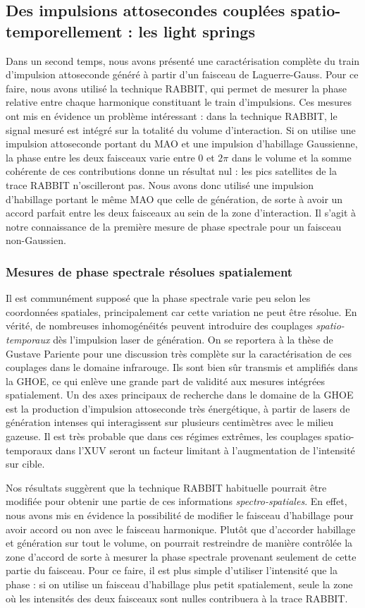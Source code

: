 \subsection{Des impulsions attosecondes couplées spatio-temporellement : les light springs}
Dans un second temps, nous avons présenté une caractérisation complète du train d'impulsion attoseconde généré à partir d'un faisceau de Laguerre-Gauss. Pour ce faire, nous avons utilisé la technique RABBIT, qui permet de mesurer la phase relative entre chaque harmonique constituant le train d'impulsions. Ces mesures ont mis en évidence un problème intéressant : dans la technique RABBIT, le signal mesuré est intégré sur la totalité du volume d'interaction. Si on utilise une impulsion attoseconde portant du MAO et une impulsion d'habillage Gaussienne, la phase entre les deux faisceaux varie entre 0 et $2\pi$ dans le volume et la somme cohérente de ces contributions donne un résultat nul : les pics satellites de la trace RABBIT n'oscilleront pas. Nous avons donc utilisé une impulsion d'habillage portant le même MAO que celle de génération, de sorte à avoir un accord parfait entre les deux faisceaux au sein de la zone d'interaction. Il s'agit à notre connaissance de la première mesure de phase spectrale pour un faisceau non-Gaussien.

\subsubsection{Mesures de phase spectrale résolues spatialement}
Il est communément supposé que la phase spectrale varie peu selon les coordonnées spatiales, principalement car cette variation ne peut être résolue. En vérité, de nombreuses inhomogénéités peuvent introduire des couplages \textit{spatio-temporaux} dès l'impulsion laser de génération. On se reportera à la thèse de Gustave Pariente pour une discussion très complète sur la caractérisation de ces couplages dans le domaine infrarouge. Ils sont bien sûr transmis et amplifiés dans la GHOE, ce qui enlève une grande part de validité aux mesures intégrées spatialement. Un des axes principaux de recherche dans le domaine de la GHOE est la production d'impulsion attoseconde très énergétique, à partir de lasers de génération intenses qui interagissent sur plusieurs centimètres avec le milieu gazeuse. Il est très probable que dans ces régimes extrêmes, les couplages spatio-temporaux dans l'XUV seront un facteur limitant à l'augmentation de l'intensité sur cible.

Nos résultats suggèrent que la technique RABBIT habituelle pourrait être modifiée pour obtenir une partie de ces informations \textit{spectro-spatiales}. En effet, nous avons mis en évidence la possibilité de modifier le faisceau d'habillage pour avoir accord ou non avec le faisceau harmonique. Plutôt que d'accorder habillage et génération sur tout le volume, on pourrait restreindre de manière contrôlée la zone d'accord de sorte à mesurer la phase spectrale provenant seulement de cette partie du faisceau. Pour ce faire, il est plus simple d'utiliser l'intensité que la phase : si on utilise un faisceau d'habillage plus petit spatialement, seule la zone où les intensités des deux faisceaux sont nulles contribuera à la trace RABBIT. 

